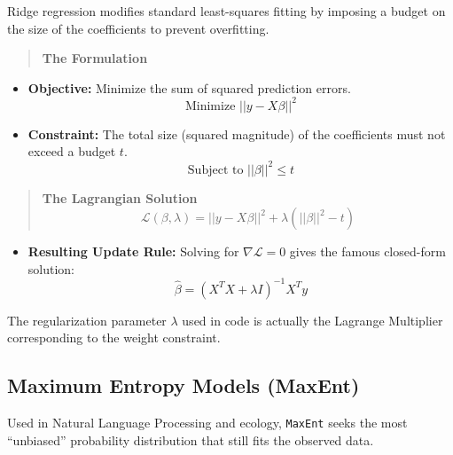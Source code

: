 \documentclass[
  letterpaper,
  DIV=11,
  numbers=noendperiod]{scrreprt}
\providecommand{\tightlist}{%
  \setlength{\itemsep}{0pt}\setlength{\parskip}{0pt}}
\begin{document}
Ridge regression modifies standard least-squares fitting by imposing a
budget on the size of the coefficients to prevent overfitting.

\begin{quote}
\textbf{The Formulation}
\end{quote}

\begin{itemize}
\item
  \textbf{Objective:} Minimize the sum of squared prediction errors.
  \[\text{Minimize } ||y - X\beta||^2\]
\item
  \textbf{Constraint:} The total size (squared magnitude) of the
  coefficients must not exceed a budget \(t\).
  \[\text{Subject to } ||\beta||^2 \le t\]
\end{itemize}

\begin{quote}
\textbf{The Lagrangian Solution}
\[\mathcal{L}(\beta, \lambda) = ||y - X\beta||^2 + \lambda(||\beta||^2 - t)\]
\end{quote}

\begin{itemize}
\tightlist
\item
  \textbf{Resulting Update Rule:} Solving for \(\nabla \mathcal{L} = 0\)
  gives the famous closed-form solution:
  \[\hat{\beta} = (X^T X + \lambda I)^{-1} X^T y\]
\end{itemize}

\begin{tcolorbox}[enhanced jigsaw, leftrule=.75mm, rightrule=.15mm, colback=white, colbacktitle=quarto-callout-note-color!10!white, arc=.35mm, opacityback=0, toptitle=1mm, bottomrule=.15mm, bottomtitle=1mm, titlerule=0mm, title=\textcolor{quarto-callout-note-color}{\faInfo}\hspace{0.5em}{Insight:}, toprule=.15mm, left=2mm, coltitle=black, breakable, colframe=quarto-callout-note-color-frame, opacitybacktitle=0.6]

The regularization parameter \(\lambda\) used in code is actually the
Lagrange Multiplier corresponding to the weight constraint.

\end{tcolorbox}

\subsection{Maximum Entropy Models
(MaxEnt)}\label{maximum-entropy-models-maxent}

Used in Natural Language Processing and ecology, \texttt{MaxEnt} seeks
the most ``unbiased'' probability distribution that still fits the
observed data.
\end{document}
